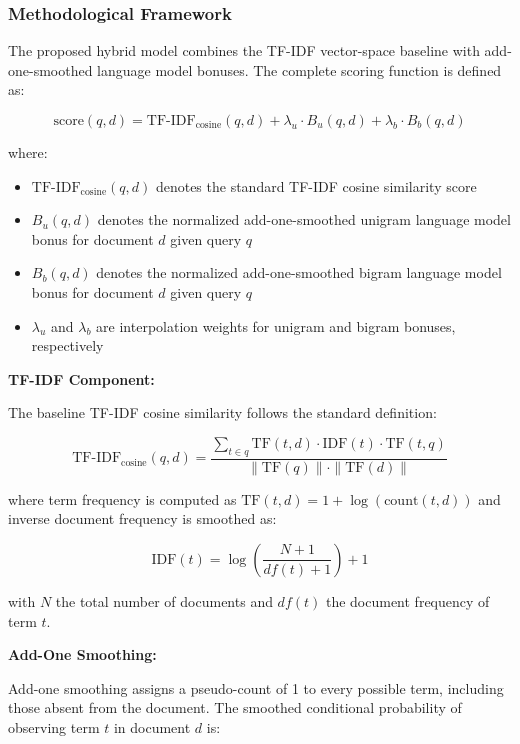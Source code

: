 \vspace{0.2cm}

\subsubsection{Methodological Framework}

The proposed hybrid model combines the TF-IDF vector-space baseline with add-one-smoothed language model bonuses. The complete scoring function is defined as:

\[
\text{score}(q,d) = \text{TF-IDF}_{\text{cosine}}(q,d) + \lambda_u \cdot B_u(q,d) + \lambda_b \cdot B_b(q,d)
\]

where:
\begin{itemize}
    \item $\text{TF-IDF}_{\text{cosine}}(q,d)$ denotes the standard TF-IDF cosine similarity score
    \item $B_u(q,d)$ denotes the normalized add-one-smoothed unigram language model bonus for document $d$ given query $q$
    \item $B_b(q,d)$ denotes the normalized add-one-smoothed bigram language model bonus for document $d$ given query $q$
    \item $\lambda_u$ and $\lambda_b$ are interpolation weights for unigram and bigram bonuses, respectively
\end{itemize}

\vspace{0.3cm}

\textbf{TF-IDF Component:}

The baseline TF-IDF cosine similarity follows the standard definition:

\[
\text{TF-IDF}_{\text{cosine}}(q,d) = \frac{\sum_{t \in q} \text{TF}(t,d) \cdot \text{IDF}(t) \cdot \text{TF}(t,q)}{\|\text{TF}(q)\| \cdot \|\text{TF}(d)\|}
\]

where term frequency is computed as $\text{TF}(t,d) = 1 + \log(\text{count}(t,d))$ and inverse document frequency is smoothed as:

\[
\text{IDF}(t) = \log\left(\frac{N+1}{df(t)+1}\right) + 1
\]

with $N$ the total number of documents and $df(t)$ the document frequency of term $t$.

\vspace{0.3cm}

\textbf{Add-One Smoothing:}

Add-one smoothing assigns a pseudo-count of 1 to every possible term, including those absent from the document. The smoothed conditional probability of observing term $t$ in document $d$ is:

